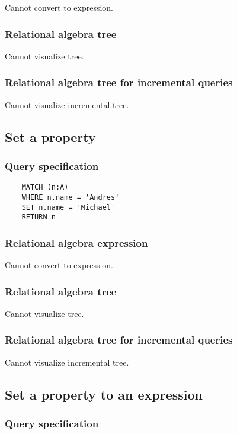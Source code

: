 	Cannot convert to expression.

	\subsubsection*{Relational algebra tree}

	Cannot visualize tree.

	\subsubsection*{Relational algebra tree for incremental queries}

	Cannot visualize incremental tree.
	\subsection{Set a property}

	\subsubsection*{Query specification}

	\begin{lstlisting}
	MATCH (n:A)
	WHERE n.name = 'Andres'
	SET n.name = 'Michael'
	RETURN n
	\end{lstlisting}


	\subsubsection*{Relational algebra expression}

	Cannot convert to expression.

	\subsubsection*{Relational algebra tree}

	Cannot visualize tree.

	\subsubsection*{Relational algebra tree for incremental queries}

	Cannot visualize incremental tree.
	\subsection{Set a property to an expression}

	\subsubsection*{Query specification}

